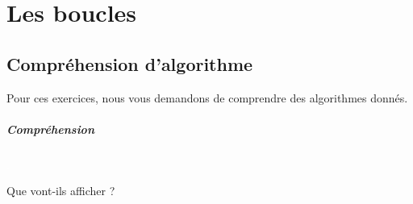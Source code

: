 \documentclass[11pt,a4paper]{article}
\begin{document}
            \begin{abstract}
			Ces exercices ont pour but de v\'erifier que vous avez fix\'e les structures alternatives qui permettent de conditionner
      des parties d'algorithmes, de code.
		
            \par
        \end{abstract}
				\vspace{-2em}\tableofcontents
				\pagestyle{plain}
            \clearpage
            \fancyhead[L,C,R]{}
            \fancyfoot[L,C]{}
            \fancyfoot[R]{ \scriptsize{\textcolor{gray}{
				InitTableau - page \thepage}}}
				\thispagestyle{fancy}
				\pagestyle{fancy}
	   
            \section{Les boucles}\subsection{Compr\'ehension d'algorithme}
          Pour ces exercices, nous vous demandons de comprendre des algorithmes donn\'es. 
          
			
		\subparagraph{Compr\'ehension} 
		
                \textcolor{white}{.} \par
            
							  Que vont-ils afficher ?
              
\end{document}
